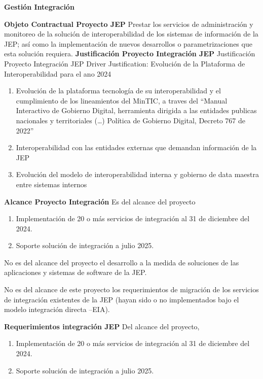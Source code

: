 \documentclass[
  paper=a4,
  ,captions=tableheading
]{scrartcl}
\providecommand{\tightlist}{%
  \setlength{\itemsep}{0pt}\setlength{\parskip}{0pt}}
\begin{document}
\textbf{Gestión Integración}

\textbf{Objeto Contractual Proyecto JEP} Prestar los servicios de
administración y monitoreo de la solución de interoperabilidad de los
sistemas de información de la JEP; así como la implementación de nuevos
desarrollos o parametrizaciones que esta solución requiera.
\textbf{Justificación Proyecto Integración JEP} Justificación Proyecto
Integración JEP \textbar{} Driver \textbar{} Justification: Evolución de
la Plataforma de Interoperabilidad para el ano 2024

\begin{enumerate}
\def\labelenumi{\arabic{enumi}.}
\tightlist
\item
  Evolución de la plataforma tecnología de su interoperabilidad y el
  cumplimiento de los lineamientos del MinTIC, a traves del ``Manual
  Interactivo de Gobierno Digital, herramienta dirigida a las entidades
  publicas nacionales y territoriales (\ldots) Política de Gobierno
  Digital, Decreto 767 de 2022''
\item
  Interoperabilidad con las entidades externas que demandan información
  de la JEP
\item
  Evolución del modelo de interoperabilidad interna y gobierno de data
  maestra entre sistemas internos
\end{enumerate}

\textbf{Alcance Proyecto Integración} Es del alcance del proyecto

\begin{enumerate}
\def\labelenumi{\arabic{enumi}.}
\tightlist
\item
  Implementación de 20 o más servicios de integración al 31 de diciembre
  del 2024.
\item
  Soporte solución de integración a julio 2025.
\end{enumerate}

No es del alcance del proyecto el desarrollo a la medida de soluciones
de las aplicaciones y sistemas de software de la JEP.

No es del alcance de este proyecto los requerimientos de migración de
los servicios de integración existentes de la JEP (hayan sido o no
implementados bajo el modelo integración directa --EIA).

\textbf{Requerimientos integración JEP} Del alcance del proyecto,

\begin{enumerate}
\def\labelenumi{\arabic{enumi}.}
\tightlist
\item
  Implementación de 20 o más servicios de integración al 31 de diciembre
  del 2024.
\item
  Soporte solución de integración a julio 2025.
\end{enumerate}
\end{document}
